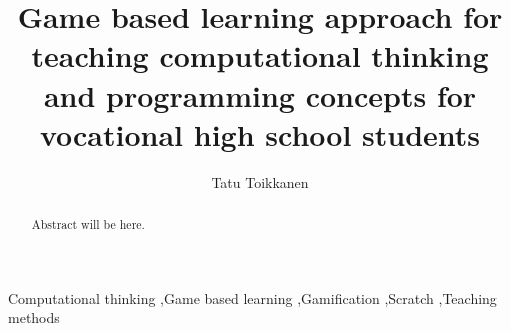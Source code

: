 \documentclass[final,5p,times,twocolumn,authoryear]{elsarticle}
\begin{document}
\begin{frontmatter}



\title{Game based learning approach for teaching computational thinking and programming concepts for vocational high school students}


\author{Tatu Toikkanen}

\begin{abstract}
Abstract will be here.
\end{abstract}



\begin{keyword}
Computational thinking \sep Game based learning \sep Gamification \sep Scratch \sep Teaching methods



\end{keyword}


\end{frontmatter}
\end{document}
